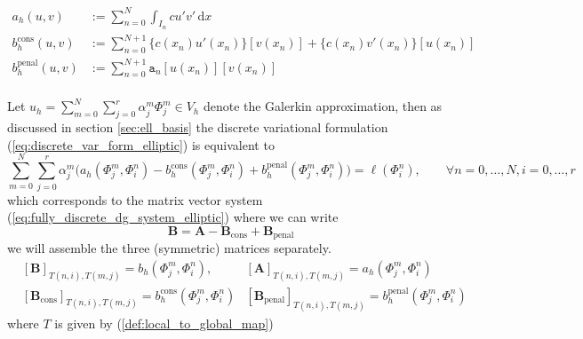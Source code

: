 \begin{align*}
	a_h(u,v)                & := \sum_{n=0}^N \int_{I_n} cu'v'\, \text{d}x                              \\
	b_h^{\text{cons}}(u,v)  & := \sum_{n=0}^{N+1} \{c(x_n)u'(x_n)\}[v(x_n)] + \{c(x_n)v'(x_n)\}[u(x_n)] \\
	b_h^{\text{penal}}(u,v) & := \sum_{n=0}^{N+1} \texttt{a}_n[u(x_n)][v(x_n)]                          \\
\end{align*}

Let $\displaystyle u_h = \sum_{m=0}^{N} \sum_{j=0}^{r} \alpha_j^m \Phi_j^m \in V_h$ denote
the Galerkin approximation, then as discussed in section \ref{sec:ell_basis} the discrete variational formulation (\ref{eq:discrete_var_form_elliptic}) is equivalent
to
\begin{equation}
	\sum_{m=0}^{N} \sum_{j=0}^{r} \alpha_j^m \Big(
	a_h(\Phi_j^m,\Phi_i^n) - b_h^{\text{cons}}(\Phi_j^m,\Phi_i^n) + b_h^{\text{penal}}(\Phi_j^m,\Phi_i^n)
	\Big)
	= \ell(\Phi_i^n), \qquad \forall n=0,\ldots,N, i=0,\ldots,r
\end{equation}
which corresponds to the matrix vector system (\ref{eq:fully_discrete_dg_system_elliptic})
where we can write
\begin{equation*}
	\textbf{B} = \textbf{A} - \textbf{B}_{\text{cons}} + \textbf{B}_{\text{penal}}
\end{equation*}
we will assemble the three (symmetric) matrices separately.
\begin{align*}
	 & [\textbf{B}]_{T(n,i),T(m,j)} = b_h(\Phi_j^m, \Phi_i^n),
	 & [\textbf{A}]_{T(n,i),T(m,j)} = a_h(\Phi_j^m, \Phi_i^n)                                \\
	 & [\textbf{B}_{\text{cons}}]_{T(n,i),T(m,j)} = b_h^{\text{cons}} (\Phi_j^m, \Phi_i^n)
	 & [\textbf{B}_{\text{penal}}]_{T(n,i),T(m,j)} = b_h^{\text{penal}} (\Phi_j^m, \Phi_i^n)
\end{align*}
where $T$ is given by (\ref{def:local_to_global_map})


